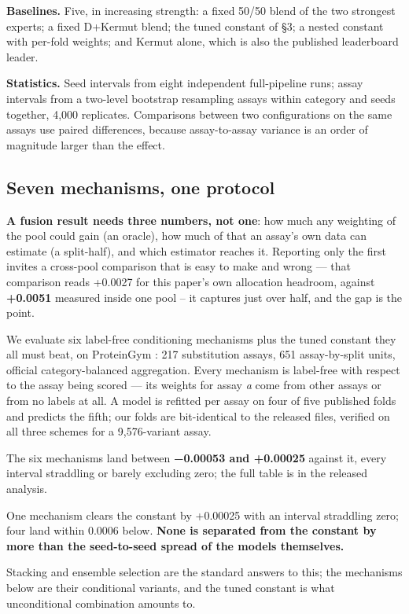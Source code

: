 \documentclass{article}
\begin{document}
\textbf{Baselines.} Five, in increasing strength: a fixed 50/50 blend of the two strongest experts; a fixed
D+Kermut blend; the tuned constant of §3; a nested constant with per-fold weights; and Kermut alone, which
is also the published leaderboard leader.

\textbf{Statistics.} Seed intervals from eight independent full-pipeline runs; assay intervals from a two-level
bootstrap resampling assays within category and seeds together, 4,000 replicates. Comparisons between two
configurations on the same assays use paired differences, because assay-to-assay variance is an order of
magnitude larger than the effect.

\subsection{Seven mechanisms, one protocol}\label{seven-mechanisms-one-protocol}

\textbf{A fusion result needs three numbers, not one}: how much any weighting of the pool could gain (an oracle),
how much of that an assay's own data can estimate (a split-half), and which estimator reaches it. Reporting
only the first invites a cross-pool comparison that is easy to make and wrong --- that comparison reads +0.0027
for this paper's own allocation headroom, against \textbf{+0.0051} measured inside one pool -- it captures just over half, and the gap is the point.

We evaluate six label-free conditioning mechanisms plus the tuned constant they all must beat, on
ProteinGym \cite{proteingym}: 217 substitution assays, 651 assay-by-split units, official
category-balanced aggregation. Every mechanism is label-free with respect to the assay being scored ---
its weights for assay \emph{a} come from other assays or from no labels at all. A model is refitted per assay
on four of five published folds and predicts the fifth; our folds are bit-identical to the released
files, verified on all three schemes for a 9,576-variant assay.

The six mechanisms land between \textbf{−0.00053 and +0.00025} against it, every interval straddling or barely
excluding zero; the full table is in the released analysis.

One mechanism clears the constant by +0.00025 with an interval straddling zero; four land within 0.0006
below. \textbf{None is separated from the constant by more than the seed-to-seed spread of the models themselves.}

Stacking \cite{wolpert1992stacked} and ensemble selection \cite{caruana2004ensemble} are the standard answers to
this; the mechanisms below are their conditional variants, and the tuned constant is what unconditional combination
amounts to.
\end{document}
